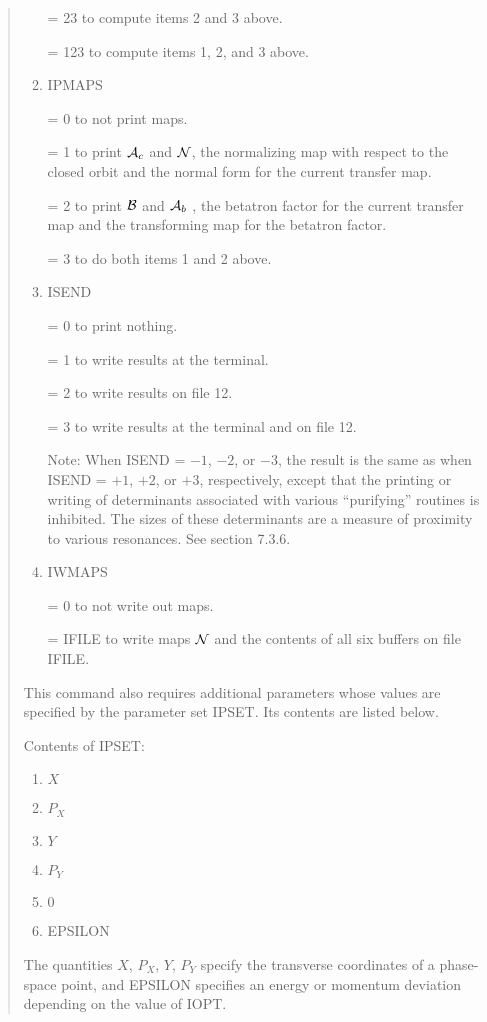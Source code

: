 \begin{quotation}
\begin{enumerate}
             =  23 to compute items 2 and 3 above.

             = 123 to compute items 1, 2, and 3 above.

      \item  IPMAPS

             = 0 to not print maps.

             = 1 to print ${\cal A}_c$  and ${\cal N}$, the normalizing map with
             respect to
               the closed \hspace*{1em}orbit and the normal form for the current
               transfer map.

             = 2 to print ${\cal B}$ and ${\cal A}_b$ , the betatron factor for the current
               transfer map \hspace*{1em}and the transforming map for the betatron
               factor.

             = 3 to do both items 1 and 2 above.

      \item  ISEND

             = 0 to print nothing.

             = 1 to write results at the terminal.

             = 2 to write results on file 12.

             = 3 to write results at the terminal and on file 12.

             Note:  When ISEND = $-1$, $-2$, or $-3$, the result is the same as
             when ISEND = $+1$, $+2$, or $+3$, respectively, except that the
             printing or writing of determinants associated with various
             ``purifying'' routines is inhibited.  The sizes of these
             determinants are a measure of proximity to various resonances.  See section 7.3.6.

      \item  IWMAPS

             = 0 to not write out maps.

             = IFILE to write maps ${\cal N}$ and the contents of all six
			 buffers on file IFILE.
\end{enumerate}

\vspace{5mm}
This command also requires additional parameters whose values are
specified by the parameter set IPSET.  Its contents are listed below.

\noindent Contents of  IPSET:
\begin{enumerate}
\item $X$
\item $P_X$
\item $Y$
\item $P_Y$
\item $0$
\item EPSILON
\end{enumerate}
The quantities $X$, $P_X$, $Y$, $P_Y$ specify the transverse
coordinates of a phase-space point, and EPSILON specifies an energy or
momentum deviation depending on the value of IOPT.


\end{quotation}

